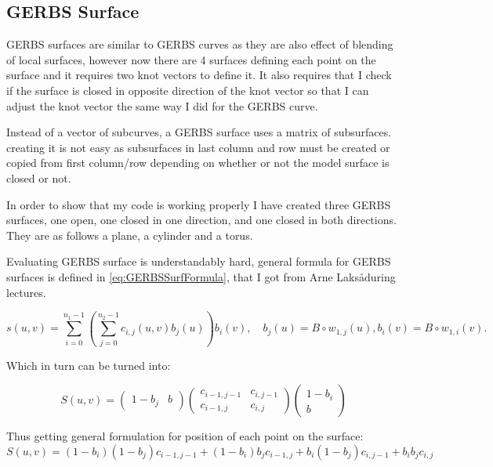 \documentclass[a4paper,12pt]{extarticle}
\begin{document}
\subsection{GERBS Surface}
GERBS surfaces are similar to GERBS curves as they are also effect of blending of local surfaces, however now there are 4 surfaces defining each point on the surface and it requires two knot vectors to define it. It also requires that I check if the surface is closed in opposite direction of the knot vector so that I can adjust the knot vector the same way I did for the GERBS curve. 

Instead of a vector of subcurves, a GERBS surface uses a matrix of subsurfaces. creating it is not easy as subsurfaces in last column and row must be created or copied from first column/row depending on whether or not the model surface is closed or not.

In order to show that my code is working properly I have created three GERBS surfaces, one open, one closed in one direction, and one closed in both directions. They are as follows a plane, a cylinder and a torus.

Evaluating GERBS surface is understandably hard, general formula for GERBS surfaces is defined in \cref{eq:GERBSSurfFormula}, that I got from Arne Laks\aa during lectures.

\begin{equation}
s(u,v)= \sum_{i=0}^{n_1-1} \left( \sum_{j=0}^{n_2-1} c_{i,j}(u,v) b_j(u) \right) b_i(v), \quad b_j(u) = B \circ w_{1,j}(u), b_i(v) = B \circ w_{1,i}(v).
\label{eq:GERBSSurfFormula}
\end{equation}

Which in turn can be turned into:

\begin{equation}
S(u,v)=
\begin{pmatrix}
1-b_j & b
\end{pmatrix}
\begin{pmatrix}
c_{i-1,j-1} & c_{i,j-1}\\
c_{i-1,j} & c_{i,j}
\end{pmatrix}
\begin{pmatrix}
1-b_i \\
b
\end{pmatrix}
\end{equation}

Thus getting general formulation for position of each point on the surface:
\begin{equation}
  S(u,v)= (1-b_i) (1-b_j) c_{i-1,j-1} + (1-b_i) b_j c_{i-1,j} + b_i (1-b_j) c_{i,j-1} + b_i b_j c_{i,j}
  \label{eq:GERBSGeneral}
\end{equation}
\end{document}
